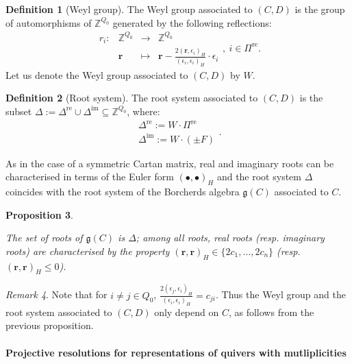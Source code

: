 \documentclass[11pt,english]{article}
\numberwithin{equation}{section}
\numberwithin{figure}{section}
\theoremstyle{definition}
\newtheorem{df}{Definition}[subsection]
\theoremstyle{plain}
\newtheorem{prop}[df]{Proposition}
\theoremstyle{remark}
\newtheorem{rmk}[df]{Remark}
\newcommand\rr{\mathbf{r}}
\newcommand\ZZ{\mathbb{Z}}
\begin{document}
\begin{df}[Weyl group]

The Weyl group associated to $(C,D)$ is the group of automorphisms
of $\ZZ^{Q_{0}}$ generated by the following reflections:\[
\begin{array}{cccc}
r_i: & \ZZ^{Q_0} & \rightarrow & \ZZ^{Q_0} \\
& \rr & \mapsto & \rr-\frac{2(\rr,\epsilon_i)_H}{(\epsilon_i,\epsilon_i)_H}\cdot \epsilon_i
\end{array}
,\ i\in\Pi^{\mathrm{re}}.
\] Let us denote the Weyl group associated to $(C,D)$ by $W$.

\end{df}

\begin{df}[Root system]

The root system associated to $(C,D)$ is the subset $\Delta:=\Delta^{\mathrm{re}}\cup\Delta^{\mathrm{im}}\subseteq\ZZ^{Q_{0}}$,
where:\[
\begin{array}{l}
\Delta^{\mathrm{re}}:=W\cdot\Pi^{\mathrm{re}} \\
\Delta^{\mathrm{im}}:=W\cdot (\pm F)
\end{array}
.
\]

\end{df}

As in the case of a symmetric Cartan matrix, real and imaginary roots
can be characterised in terms of the Euler form $(\bullet,\bullet)_{H}$
and the root system $\Delta$ coincides with the root system of the
Borcherds algebra $\mathfrak{g}(C)$ associated to $C$.

\begin{prop}{\cite[\S 11.13]{Kac95}}

The set of roots of $\mathfrak{g}(C)$ is $\Delta$; among all roots,
real roots (resp. imaginary roots) are characterised by the property
$(\rr,\rr)_{H}\in\{2c_{1},\ldots,2c_{n}\}$ (resp. $(\rr,\rr)_{H}\leq0$).

\end{prop}

\begin{rmk}

Note that for $i\ne j\in Q_{0}$, $\frac{2(\epsilon_{j},\epsilon_{i})_{H}}{(\epsilon_{i},\epsilon_{i})_{H}}=c_{ji}$.
Thus the Weyl group and the root system associated to $(C,D)$ only
depend on $C$, as follows from the previous proposition.

\end{rmk}

\paragraph*{Projective resolutions for representations of quivers with mutliplicities}
\end{document}
